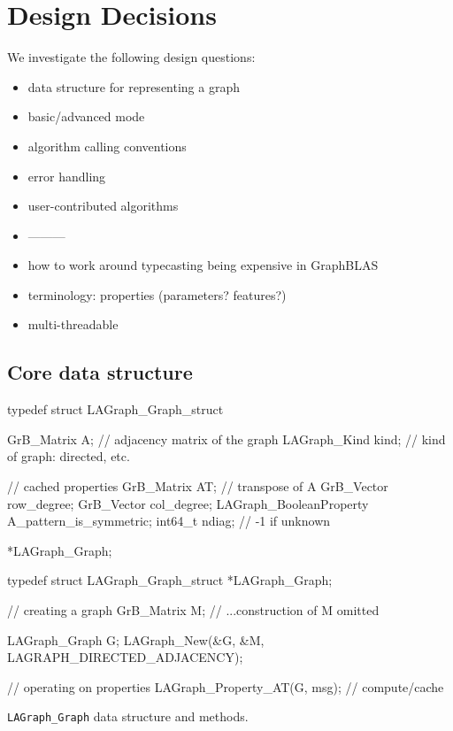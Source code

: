 \section{Design Decisions}
\label{sec:decisions}


We investigate the following design questions:

\begin{itemize}
    \item data structure for representing a graph
    \item basic/advanced mode
    \item algorithm calling conventions
    \item error handling
    \item user-contributed algorithms
    \item ---------
    \item how to work around typecasting being expensive in GraphBLAS
    \item terminology: properties (parameters? features?)
    \item multi-threadable
\end{itemize}


\subsection{Core data structure}

\begin{listing}
\begin{cplus}
typedef struct LAGraph_Graph_struct
{
    GrB_Matrix   A;      // adjacency matrix of the graph
    LAGraph_Kind kind;   // kind of graph: directed, etc.
    
    // cached properties
    GrB_Matrix   AT;     // transpose of A
    GrB_Vector   row_degree;
    GrB_Vector   col_degree;
    LAGraph_BooleanProperty A_pattern_is_symmetric;
    int64_t      ndiag;  // -1 if unknown
} *LAGraph_Graph;

typedef struct LAGraph_Graph_struct *LAGraph_Graph;

// creating a graph
GrB_Matrix M;
// ...construction of M omitted

LAGraph_Graph G;
LAGraph_New(&G, &M, LAGRAPH_DIRECTED_ADJACENCY);

// operating on properties
LAGraph_Property_AT(G, msg);  // compute/cache
\end{cplus}
\caption{{\tt LAGraph\_Graph} data structure and methods.}
\label{Lst.graph}
\end{listing}

